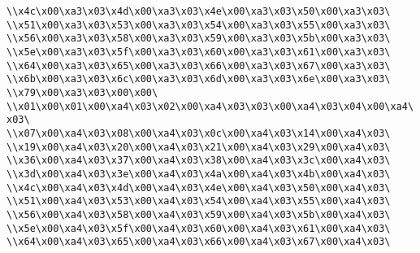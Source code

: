 \verb|\\x4c\x00\xa3\x03\x4d\x00\xa3\x03\x4e\x00\xa3\x03\x50\x00\xa3\x03\|\newline
\verb|\\x51\x00\xa3\x03\x53\x00\xa3\x03\x54\x00\xa3\x03\x55\x00\xa3\x03\|\newline
\verb|\\x56\x00\xa3\x03\x58\x00\xa3\x03\x59\x00\xa3\x03\x5b\x00\xa3\x03\|\newline
\verb|\\x5e\x00\xa3\x03\x5f\x00\xa3\x03\x60\x00\xa3\x03\x61\x00\xa3\x03\|\newline
\verb|\\x64\x00\xa3\x03\x65\x00\xa3\x03\x66\x00\xa3\x03\x67\x00\xa3\x03\|\newline
\verb|\\x6b\x00\xa3\x03\x6c\x00\xa3\x03\x6d\x00\xa3\x03\x6e\x00\xa3\x03\|\newline
\verb|\\x79\x00\xa3\x03\x00\x00\|\newline
\verb|\\x01\x00\x01\x00\xa4\x03\x02\x00\xa4\x03\x03\x00\xa4\x03\x04\x00\xa4\x03\|\newline
\verb|\\x07\x00\xa4\x03\x08\x00\xa4\x03\x0c\x00\xa4\x03\x14\x00\xa4\x03\|\newline
\verb|\\x19\x00\xa4\x03\x20\x00\xa4\x03\x21\x00\xa4\x03\x29\x00\xa4\x03\|\newline
\verb|\\x36\x00\xa4\x03\x37\x00\xa4\x03\x38\x00\xa4\x03\x3c\x00\xa4\x03\|\newline
\verb|\\x3d\x00\xa4\x03\x3e\x00\xa4\x03\x4a\x00\xa4\x03\x4b\x00\xa4\x03\|\newline
\verb|\\x4c\x00\xa4\x03\x4d\x00\xa4\x03\x4e\x00\xa4\x03\x50\x00\xa4\x03\|\newline
\verb|\\x51\x00\xa4\x03\x53\x00\xa4\x03\x54\x00\xa4\x03\x55\x00\xa4\x03\|\newline
\verb|\\x56\x00\xa4\x03\x58\x00\xa4\x03\x59\x00\xa4\x03\x5b\x00\xa4\x03\|\newline
\verb|\\x5e\x00\xa4\x03\x5f\x00\xa4\x03\x60\x00\xa4\x03\x61\x00\xa4\x03\|\newline
\verb|\\x64\x00\xa4\x03\x65\x00\xa4\x03\x66\x00\xa4\x03\x67\x00\xa4\x03\|\newline
